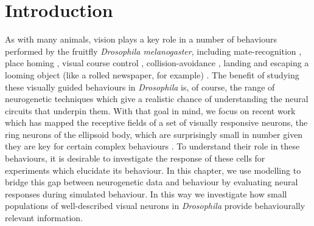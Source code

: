 \section{Introduction}

As with many animals, vision plays a key role in a number of behaviours performed by the fruitfly \emph{Drosophila melanogaster}, including mate-recognition \cite{Agrawal2014}, place homing \cite{Ofstad2011}, visual course control \cite{Borst2014}, collision-avoidance \cite{Tammero2002}, landing \cite{Tammero2002} and escaping a looming object (like a rolled newspaper, for example) \cite{Card2008}. The benefit of studying these visually guided behaviours in \emph{Drosophila} is, of course, the range of neurogenetic techniques which give a realistic chance of understanding the neural circuits that underpin them. With that goal in mind, we focus on recent work \cite{Seelig2013} which has mapped the receptive fields of a set of visually responsive neurons, the ring neurons of the ellipsoid body, which are surprisingly small in number given they are key for certain complex behaviours \cite{Seelig2015,Neuser2008,Liu2006}. To understand their role in these behaviours, it is desirable to investigate the response of these cells for experiments which elucidate its behaviour. In this chapter, we use modelling to bridge this gap between neurogenetic data and behaviour by evaluating neural responses during simulated behaviour. In this way we investigate how small populations of well-described visual neurons in \emph{Drosophila} provide behaviourally relevant information.


